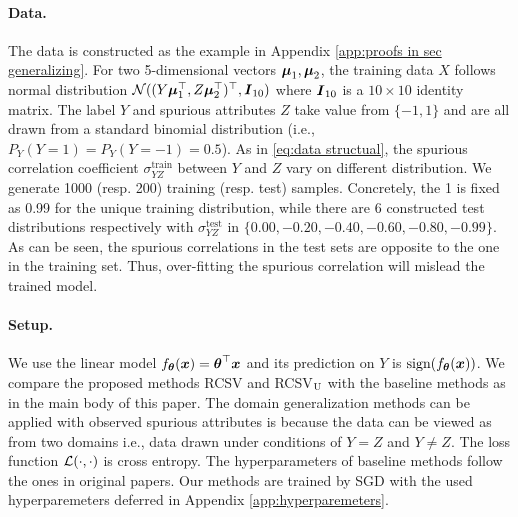 \paragraph{Data.} The data is constructed as the example in Appendix \ref{app:proofs in sec generalizing}. For two 5-dimensional vectors $\text{\boldmath{$\mu$}}_{1}, \text{\boldmath{$\mu$}}_{2}$, the training data $X$ follows normal distribution $\mathcal{N}((Y\text{\boldmath{$\mu$}}_{1}^{\top}, Z\text{\boldmath{$\mu$}}_{2}^{\top})^{\top}, \boldsymbol{I}_{10})$ where $\boldsymbol{I}_{10}$ is a $10\times 10$ identity matrix. The label $Y$ and spurious attributes $Z$ take value from $\{-1, 1\}$ and are all drawn from a standard binomial distribution (i.e., $P_{Y}(Y = 1) = P_{Y}(Y = -1) = 0.5$). As in \eqref{eq:data structual}, the spurious correlation coefficient $\sigma_{YZ}^{\text{train}}$ between $Y$ and $Z$ vary on different distribution. We generate 1000 (resp. 200) training (resp. test) samples. Concretely, the 1 is fixed as 0.99 for the unique training distribution, while there are 6 constructed test distributions respectively with $\sigma_{YZ}^{\text{test}}$ in $\{0.00, -0.20, -0.40, -0.60, -0.80, -0.99\}$. As can be seen, the spurious correlations in the test sets are opposite to the one in the training set. Thus, over-fitting the spurious correlation will mislead the trained model.  
\paragraph{Setup.} We use the linear model $f_{\text{\boldmath{$\theta$}}}(\boldsymbol{x}) = \text{\boldmath{$\theta$}}^{\top}\boldsymbol{x}$ and its prediction on $Y$ is $\text{sign}(f_{\text{\boldmath{$\theta$}}}(\boldsymbol{x}) )$. We compare the proposed methods RCSV and RCSV$_{\rm U}$ with the baseline methods as in the main body of this paper. The domain generalization methods can be applied with observed spurious attributes is because the data can be viewed as from two domains i.e., data drawn under conditions of $Y= Z$ and $Y\neq Z$. The loss function $\mathcal{L}(\cdot,\cdot)$ is cross entropy. The hyperparameters of baseline methods follow the ones in original papers. Our methods are trained by SGD with the used hyperparemeters deferred in Appendix \ref{app:hyperparemeters}.
